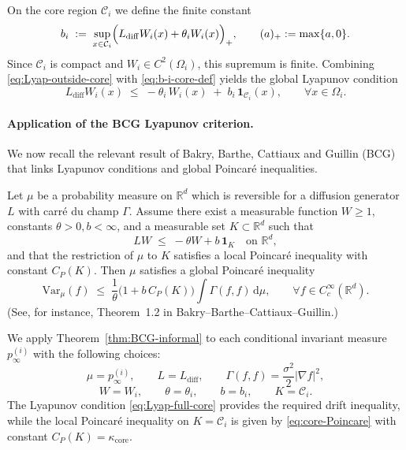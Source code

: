 On the core region \(\mathcal C_i\) we define the finite constant
\begin{equation}\label{eq:b-i-core-def}
b_i
\;:=\;
\sup_{x\in\mathcal C_i}
\Bigl(
L_{\mathrm{diff}} W_i(x) + \theta_i W_i(x)
\Bigr)_+,
\qquad
(a)_+ := \max\{a,0\}.
\end{equation}
Since \(\mathcal C_i\) is compact and \(W_i\in C^2(\Omega_i)\), this supremum is finite.
Combining \eqref{eq:Lyap-outside-core} with \eqref{eq:b-i-core-def} yields the
global Lyapunov condition
\begin{equation}\label{eq:Lyap-full-core}
L_{\mathrm{diff}} W_i(x)
\;\le\;
-\theta_i\,W_i(x)
\;+\;
b_i\,\mathbf 1_{\mathcal C_i}(x),
\qquad
\forall x\in\Omega_i.
\end{equation}

\paragraph{Application of the BCG Lyapunov criterion.}
We now recall the relevant result of Bakry, Barthe, Cattiaux and Guillin
(BCG) that links Lyapunov conditions and global Poincar\'e inequalities.

\begin{theorem}
\label{thm:BCG-informal}
Let \(\mu\) be a probability measure on \(\mathbb R^d\) which is reversible
for a diffusion generator \(L\) with carré du champ \(\Gamma\).
Assume there exist a measurable function \(W\ge 1\), constants
\(\theta>0, b<\infty\), and a measurable set \(K\subset\mathbb R^d\) such that
\[
LW \;\le\; -\theta W + b\,\mathbf 1_K
\quad\text{on }\mathbb R^d,
\]
and that the restriction of \(\mu\) to \(K\) satisfies a local Poincar\'e
inequality with constant \(C_P(K)\).
Then \(\mu\) satisfies a global Poincar\'e inequality
\[
\mathrm{Var}_\mu(f)
\;\le\;
\frac{1}{\theta}\bigl(1 + b\,C_P(K)\bigr)
\int \Gamma(f,f)\,\mathrm d\mu,
\qquad
\forall f\in C_c^\infty(\mathbb R^d).
\]
(See, for instance, Theorem~1.2 in Bakry--Barthe--Cattiaux--Guillin.)
\end{theorem}

We apply Theorem~\ref{thm:BCG-informal} to each conditional invariant
measure \(p_\infty^{(i)}\) with the following choices:
\[
\mu = p_\infty^{(i)},\qquad
L = L_{\mathrm{diff}},\qquad
\Gamma(f,f) = \frac{\sigma^2}{2}|\nabla f|^2,
\]
\[
W = W_i,\qquad
\theta = \theta_i,\qquad
b = b_i,\qquad
K = \mathcal C_i.
\]
The Lyapunov condition \eqref{eq:Lyap-full-core} provides the required drift
inequality, while the local Poincar\'e inequality on \(K=\mathcal C_i\) is
given by \eqref{eq:core-Poincare} with constant
\(C_P(K)=\kappa_{\mathrm{core}}\).

